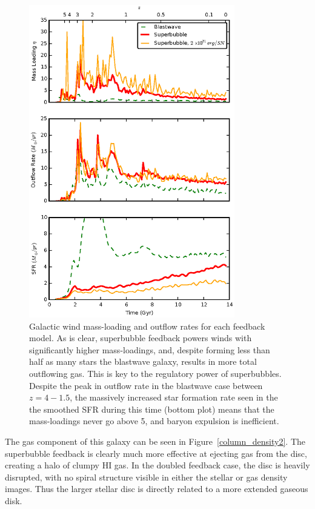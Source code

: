 \begin{figure}
    \includegraphics[width=0.8\textwidth]{figures2/massloading.eps}
    \caption[Galactic wind mass loading for different feedback models]{Galactic
    wind mass-loading and outflow rates for each feedback model.  As is clear,
    superbubble feedback powers winds with significantly higher mass-loadings,
    and, despite forming less than half as many stars the blastwave galaxy,
    results in more total outflowing gas.  This is key to the regulatory power
    of superbubbles.  Despite the peak in outflow rate in the blastwave case
    between $z=4-1.5$, the massively increased star formation rate seen in the
    the smoothed SFR during this time (bottom plot) means that the mass-loadings
    never go above 5, and baryon expulsion is inefficient.}
    \label{massloading2}
\end{figure}

The gas component of this galaxy can be seen in Figure~\ref{column_density2}.
The superbubble feedback is clearly much more effective at ejecting gas from the
disc, creating a halo of clumpy HI gas.  In the doubled feedback case, the disc
is heavily disrupted, with no spiral structure visible in either the stellar or
gas density images.  Thus the larger stellar disc is directly related to a more
extended gaseous disk.

